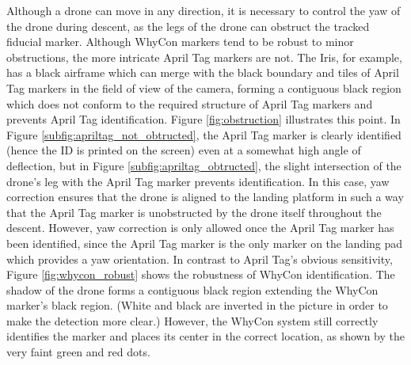 Although a drone can move in any direction, it is necessary to control the yaw of the drone during descent, as the legs of the drone can obstruct the tracked fiducial marker. Although WhyCon markers tend to be robust to minor obstructions, the more intricate April Tag markers are not. The Iris, for example, has a black airframe which can merge with the black boundary and tiles of April Tag markers in the field of view of the camera, forming a contiguous black region which does not conform to the required structure of April Tag markers and prevents April Tag identification. Figure \ref{fig:obstruction} illustrates this point. In Figure \ref{subfig:apriltag_not_obtructed}, the April Tag marker is clearly identified (hence the ID is printed on the screen) even at a somewhat high angle of deflection, but in Figure \ref{subfig:apriltag_obtructed}, the slight intersection of the drone's leg with the April Tag marker prevents identification. In this case, yaw correction  ensures that the drone is aligned to the landing platform in such a way that the April Tag marker is unobstructed by the drone itself throughout the descent. However, yaw correction is only allowed once the April Tag marker has been identified, since the April Tag marker is the only marker on the landing pad which provides a yaw orientation. In contrast to April Tag's obvious sensitivity, Figure \ref{fig:whycon_robust} shows the robustness of WhyCon identification. The shadow of the drone forms a contiguous black region extending the WhyCon marker's black region. (White and black are inverted in the picture in order to make the detection more clear.) However, the WhyCon system still correctly identifies the marker and places its center in the correct location, as shown by the very faint green and red dots.

